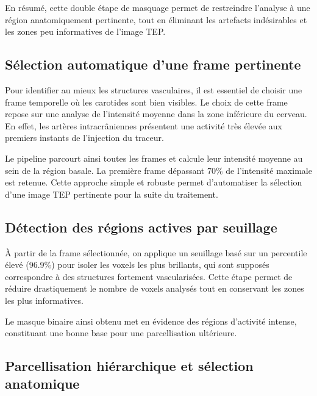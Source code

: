 \documentclass{article}
\begin{document}
        \noindent
        En résumé, cette double étape de masquage permet de restreindre l’analyse à une région anatomiquement pertinente, tout en éliminant les artefacts indésirables et les zones peu informatives de l’image TEP.


    \subsection*{Sélection automatique d’une frame pertinente}
        
        \noindent
        Pour identifier au mieux les structures vasculaires, il est essentiel de choisir une frame temporelle où les carotides sont bien visibles. Le choix de cette frame repose sur une analyse de l’intensité moyenne dans la zone inférieure du cerveau. En effet, les artères intracrâniennes présentent une activité très élevée aux premiers instants de l’injection du traceur.
        
        \noindent
        Le pipeline parcourt ainsi toutes les frames et calcule leur intensité moyenne au sein de la région basale. La première frame dépassant 70\% de l’intensité maximale est retenue. Cette approche simple et robuste permet d’automatiser la sélection d’une image TEP pertinente pour la suite du traitement.
        
    \vspace{0.5em}
    \subsection*{Détection des régions actives par seuillage}
        
        \noindent
        À partir de la frame sélectionnée, on applique un seuillage basé sur un percentile élevé (96.9\%) pour isoler les voxels les plus brillants, qui sont supposés correspondre à des structures fortement vascularisées. Cette étape permet de réduire drastiquement le nombre de voxels analysés tout en conservant les zones les plus informatives.
        
        \noindent
        Le masque binaire ainsi obtenu met en évidence des régions d’activité intense, constituant une bonne base pour une parcellisation ultérieure.
        
        \vspace{0.5em}
        \subsection*{Parcellisation hiérarchique et sélection anatomique}
        
\end{document}

